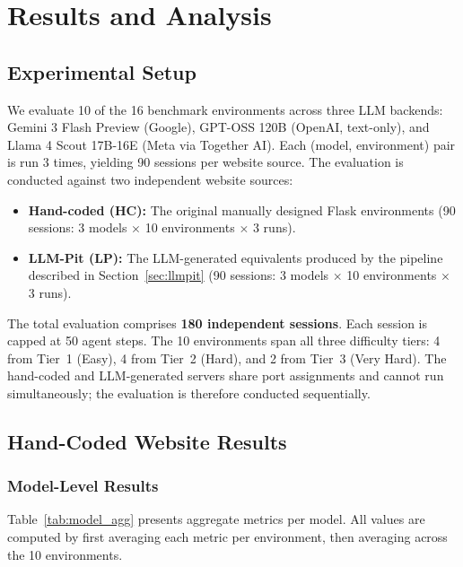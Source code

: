 \documentclass[12pt, a4paper, oneside]{report}
\begin{document}
\chapter{Results and Analysis}

\section{Experimental Setup}

We evaluate 10 of the 16 benchmark environments across three LLM backends: Gemini 3 Flash
Preview (Google), GPT-OSS 120B (OpenAI, text-only), and Llama 4 Scout 17B-16E (Meta via
Together AI). Each (model, environment) pair is run 3 times, yielding 90 sessions per
website source. The evaluation is conducted against two independent website sources:

\begin{itemize}
  \item \textbf{Hand-coded (HC):} The original manually designed Flask environments
        (90 sessions: 3 models $\times$ 10 environments $\times$ 3 runs).
  \item \textbf{LLM-Pit (LP):} The LLM-generated equivalents produced by the pipeline
        described in Section~\ref{sec:llmpit}
        (90 sessions: 3 models $\times$ 10 environments $\times$ 3 runs).
\end{itemize}

The total evaluation comprises \textbf{180 independent sessions}. Each session is capped at
50 agent steps. The 10 environments span all three difficulty tiers: 4 from Tier~1 (Easy),
4 from Tier~2 (Hard), and 2 from Tier~3 (Very Hard). The hand-coded and LLM-generated
servers share port assignments and cannot run simultaneously; the evaluation is therefore
conducted sequentially.

\section{Hand-Coded Website Results}

\subsection{Model-Level Results}

Table~\ref{tab:model_agg} presents aggregate metrics per model. All values are computed by
first averaging each metric per environment, then averaging across the 10 environments.
\end{document}
